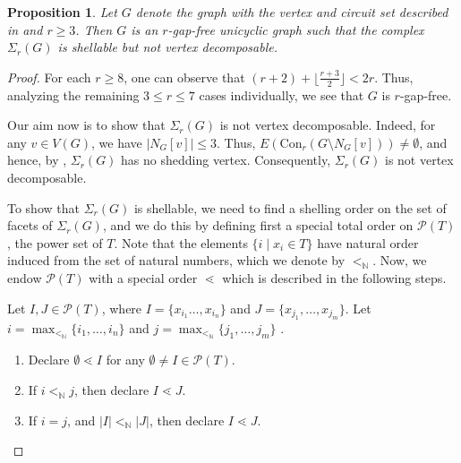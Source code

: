 \documentclass[12pt,reqno]{amsart}
\newtheorem{proposition}{Proposition}[section]
\theoremstyle{definition}
\newcommand{\Con}{{\mathrm{Con}}}
\begin{document}
	\begin{proposition}\label{shell but not VD}
		Let $G$ denote the graph with the vertex and circuit set described in  and $r \ge 3$. Then $G$ is an $r$-gap-free unicyclic graph such that the complex $\Sigma_{r}(G)$ is shellable but not vertex decomposable.
	\end{proposition}
	\begin{proof}
For each $r\ge 8$, one can observe that $(r+2)+\lfloor\frac{r+3}{2}\rfloor<2r$. Thus, analyzing the remaining $3\le r\le 7$ cases individually, we see that $G$ is $r$-gap-free. 
	
	Our aim now is to show that $\Sigma_r(G)$ is not vertex decomposable. Indeed, for any $v\in V(G)$, we have $|N_G[v]|\le 3$. Thus, $E(\Con_r(G\setminus N_G[v])) \neq \emptyset$, and hence, by , $\Sigma_r(G)$ has no shedding vertex. Consequently, $\Sigma_r(G)$ is not vertex decomposable.
    
		To show that $\Sigma_{r}(G)$ is shellable, we need to find a shelling order on the set of facets of $\Sigma_{r}(G)$, and we do this by defining first a special total order on $\mathcal P(T)$, the power set of $T$. Note that the elements $\{i\mid x_i\in T\}$ have natural order induced from the set of natural numbers, which we denote by $<_{\mathbb N}$. Now, we endow $\mathcal P(T)$ with a special order $\lessdot$ which is described in the following steps. 
		 
		 Let $I,J\in \mathcal P(T)$, where $I=\{x_{i_1}\ldots,x_{i_n}\}$ and $J=\{x_{j_1},\ldots,x_{j_m}\}$. Let $i=\max_{<_{\mathbb N}}\{i_1,\ldots,i_n\}$ and $j=\max_{<_{\mathbb N}}\{j_1,\ldots,j_m\}$ .
		 
		 \begin{enumerate}
		 	\item[{\bf Step 0:}] Declare $\emptyset\lessdot I$ for any $\emptyset\neq I\in \mathcal P(T)$.
		 	
		 	\item[{\bf Step 1:}] If $i<_{\mathbb N}j$, then declare $I\lessdot J$.
		 	
		 	\item[{\bf Step 2:}] If $i=j$, and $|I|<_{\mathbb N} |J|$, then declare $I\lessdot J$.
		 	

\end{enumerate}
\end{proof}
\end{document}
